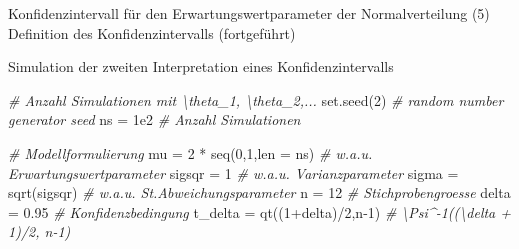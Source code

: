 \documentclass[
  8pt,
  ignorenonframetext,
]{beamer}
\newenvironment{Shaded}{\begin{snugshade}}{\end{snugshade}}
\newcommand{\AttributeTok}[1]{\textcolor[rgb]{0.77,0.63,0.00}{#1}}
\newcommand{\CommentTok}[1]{\textcolor[rgb]{0.56,0.35,0.01}{\textit{#1}}}
\newcommand{\DecValTok}[1]{\textcolor[rgb]{0.00,0.00,0.81}{#1}}
\newcommand{\FloatTok}[1]{\textcolor[rgb]{0.00,0.00,0.81}{#1}}
\newcommand{\FunctionTok}[1]{\textcolor[rgb]{0.00,0.00,0.00}{#1}}
\newcommand{\NormalTok}[1]{#1}
\newcommand{\OtherTok}[1]{\textcolor[rgb]{0.56,0.35,0.01}{#1}}
\newcommand{\SpecialCharTok}[1]{\textcolor[rgb]{0.00,0.00,0.00}{#1}}
\begin{document}
\begin{frame}[fragile]{Konfidenzintervall für den
Erwartungswertparameter der Normalverteilung}
\protect\hypertarget{konfidenzintervall-fuxfcr-den-erwartungswertparameter-der-normalverteilung-8}{}
\noindent(5) Definition des Konfidenzintervalls (fortgeführt)

\small

Simulation der zweiten Interpretation eines Konfidenzintervalls
\vspace{2mm}

\footnotesize

\begin{Shaded}
\begin{Highlighting}[]
\CommentTok{\# Anzahl Simulationen mit \textbackslash{}theta\_1, \textbackslash{}theta\_2,...}
\FunctionTok{set.seed}\NormalTok{(}\DecValTok{2}\NormalTok{)                                        }\CommentTok{\# random number generator seed}
\NormalTok{ns      }\OtherTok{=} \FloatTok{1e2}                                      \CommentTok{\# Anzahl Simulationen}

\CommentTok{\# Modellformulierung}
\NormalTok{mu      }\OtherTok{=} \DecValTok{2} \SpecialCharTok{*} \FunctionTok{seq}\NormalTok{(}\DecValTok{0}\NormalTok{,}\DecValTok{1}\NormalTok{,}\AttributeTok{len =}\NormalTok{ ns)                    }\CommentTok{\# w.a.u. Erwartungswertparameter}
\NormalTok{sigsqr  }\OtherTok{=} \DecValTok{1}                                        \CommentTok{\# w.a.u. Varianzparameter}
\NormalTok{sigma   }\OtherTok{=} \FunctionTok{sqrt}\NormalTok{(sigsqr)                             }\CommentTok{\# w.a.u. St.Abweichungsparameter}
\NormalTok{n       }\OtherTok{=} \DecValTok{12}                                       \CommentTok{\# Stichprobengroesse}
\NormalTok{delta   }\OtherTok{=} \FloatTok{0.95}                                     \CommentTok{\# Konfidenzbedingung}
\NormalTok{t\_delta }\OtherTok{=} \FunctionTok{qt}\NormalTok{((}\DecValTok{1}\SpecialCharTok{+}\NormalTok{delta)}\SpecialCharTok{/}\DecValTok{2}\NormalTok{,n}\DecValTok{{-}1}\NormalTok{)                      }\CommentTok{\# \textbackslash{}Psi\^{}{-}1((\textbackslash{}delta + 1)/2, n{-}1)}


\end{Highlighting}
\end{Shaded}
\end{frame}
\end{document}

